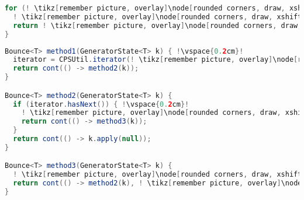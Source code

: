 \begin{center}
\begin{mdframed}[topline=true]
\begin{minipage}[t]{0.4\textwidth}
\begin{lstlisting}[language=Java, numbers=none, breaklines=true]
for (! \tikz[remember picture, overlay]\node[rounded corners, draw, xshift=-0.1cm, inner sep=5pt, anchor=west, yshift=0.1cm] {Változó}; \hspace*{1.05cm}! : ! \tikz[remember picture, overlay]\node[rounded corners, draw, xshift=-0.2cm, inner sep=5pt, anchor=west, yshift=0.1cm] {Forrás}; \vspace*{0.3cm} \hspace*{0.9cm}!) {
  ! \tikz[remember picture, overlay]\node[rounded corners, draw, xshift=-0.1cm, inner sep=5pt, anchor=west] {Kódrészlet}; \vspace*{0.5cm} ! 
  return ! \tikz[remember picture, overlay]\node[rounded corners, draw, xshift=-0.1cm, inner sep=5pt, anchor=west, yshift=0.1cm] {Kifejezés}; \vspace*{0.3cm} !
}
\end{lstlisting}
\end{minipage} 
\begin{minipage}[t]{0.6\textwidth}
\begin{lstlisting}[language=Java, numbers=none, breaklines=true]
Bounce<T> method1(GeneratorState<T> k) { !\vspace{0.2cm}!
  iterator = CPSUtil.iterator(! \tikz[remember picture, overlay]\node[rounded corners, draw, xshift=-0.1cm, yshift=0.1cm, inner sep=5pt, anchor=west] {Forrás}; \vspace{0.3cm} \hspace*{1.0cm}!);
  return cont(() -> method2(k));
}

Bounce<T> method2(GeneratorState<T> k) {
  if (iterator.hasNext()) { !\vspace{0.2cm}!
    ! \tikz[remember picture, overlay]\node[rounded corners, draw, xshift=-0.1cm, inner sep=5pt, anchor=west, yshift=0.1cm] {Változó}; \vspace*{0.2cm} \hspace*{1.1cm}! = iterator.next();
    return cont(() -> method3(k));
  }
  return cont(() -> k.apply(null));
}

Bounce<T> method3(GeneratorState<T> k) {
  ! \tikz[remember picture, overlay]\node[rounded corners, draw, xshift=-0.1cm, inner sep=5pt, anchor=west] {Kódrészlet}; \vspace*{0.3cm} !
  return cont(() -> method2(k), ! \tikz[remember picture, overlay]\node[rounded corners, draw, xshift=-0.1cm, inner sep=5pt, anchor=west, yshift=0.1cm] {Kifejezés}; \vspace*{0.2cm} \hspace*{1.2cm} !);
}
\end{lstlisting} 
\end{minipage}
\end{mdframed}
\end{center}
